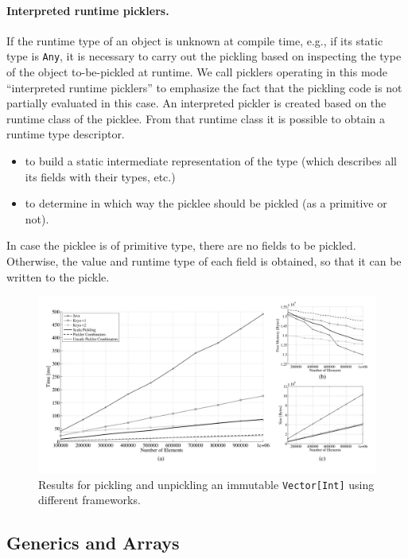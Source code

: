 \documentclass[preprint,10pt]{sigplanconf}
\theoremstyle{definition}
\theoremstyle{definition}
\newcommand{\todo}{{\bf \colorbox{red}{\color{white}TODO:}}}
\newcommand{\term}[1]{\mbox{\texttt{#1}}}
\begin{document}
\paragraph{Interpreted runtime picklers.} If the runtime type of an object is
unknown at compile time, e.g., if its static type is \term{Any}, it is
necessary to carry out the pickling based on inspecting the type of the object
to-be-pickled at runtime. We call picklers operating in this mode ``interpreted
runtime picklers'' to emphasize the fact that the pickling code is not
partially evaluated in this case. An interpreted pickler is created based on
the runtime class of the picklee. From that runtime class it is possible to
obtain a runtime type descriptor.

\begin{itemize}
\item to build a static intermediate representation of the type (which describes all its fields with their types, etc.)
\item to determine in which way the picklee should be pickled (as a primitive or not).
\end{itemize}

In case the picklee is of primitive type, there are no fields to be pickled.
Otherwise, the value and runtime type of each field is obtained, so that it
can be written to the pickle.



\begin{figure}[ht!]
 \centering
 \includegraphics[width=\textwidth]{vector.pdf}
 \caption{Results for pickling and unpickling an immutable
   \texttt{Vector[Int]} using different frameworks.}
 \label{fig:results-vector}
\end{figure}

\subsection{Generics and Arrays}
\end{document}
